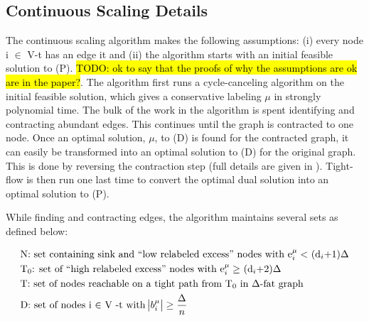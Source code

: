 \documentclass[11pt]{article}
\theoremstyle{definition}
\theoremstyle{definition}
\newcommand{\todo}[1]{\hl{TODO: #1}}
\begin{document}
	\subsection{Continuous Scaling Details}
	The continuous scaling algorithm makes the following assumptions: (i) every node i $\in$ V-t has an edge it and (ii) the algorithm starts with an initial feasible solution to (P). \todo{ok to say that the proofs of why the assumptions are ok are in the paper?}. The algorithm first runs a cycle-canceling algorithm on the initial feasible solution, which gives a conservative labeling $\mu$ in strongly polynomial time. The bulk of the work in the algorithm is spent identifying and contracting abundant edges. This continues until the graph is contracted to one node. Once an optimal solution, $\mu$, to (D) is found for the contracted graph, it can easily be transformed into an optimal solution to (D) for the original graph. This is done by reversing the contraction step (full details are given in \cite{article}). Tight-flow is then run one last time to convert the optimal dual solution into an optimal solution to (P).
	
	While finding and contracting edges, the algorithm maintains several sets as defined below:
	
	\begin{align*}
	&\text{N: set containing sink and ``low relabeled excess'' nodes with e$_i^\mu <$ (d$_i$+1)$\Delta$} \\
	&\text{T$_0$: set of ``high relabeled excess'' nodes with e$_i^\mu \geq$ (d$_i$+2)$\Delta$} \\
	&\text{T: set of nodes reachable on a tight path from T$_0$ in $\Delta$-fat graph} \\ 
	&\text{D: set of nodes i $\in$ V -t with $\abs{b_i^\mu} \geq \frac{\Delta}{n}$}
	\end{align*}
	
\end{document}
